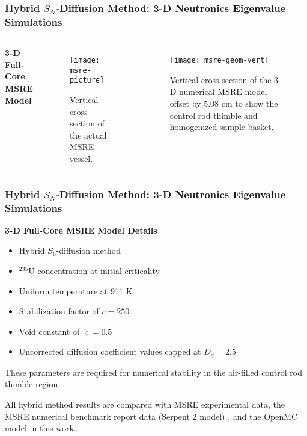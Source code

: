 \begin{frame}
  \frametitle{Hybrid $S_N$-Diffusion Method: 3-D Neutronics Eigenvalue Simulations}
  \begin{columns}
    \column{5.5cm}
  \textbf{3-D Full-Core MSRE Model}
  \begin{figure}[p]
    \centering
    \texttt{[image: msre-picture]}
    \caption{Vertical cross section of the actual \gls{MSRE} vessel.}
    \label{fig:msre-picture}
  \end{figure}
    \column{6cm}
  \begin{figure}[p]
    \centering
    \texttt{[image: msre-geom-vert]}
    \caption{Vertical cross section of the 3-D numerical \gls{MSRE} model offset by 5.08 cm to show
    the control rod thimble and homogenized sample basket.}
    \label{fig:msre-geom-vert}
  \end{figure}
\end{columns}
\end{frame}

\begin{frame}
  \frametitle{Hybrid $S_N$-Diffusion Method: 3-D Neutronics Eigenvalue Simulations}
  \textbf{3-D Full-Core MSRE Model Details}
  \begin{itemize}
    \item Hybrid $S_6$-diffusion method
    \item $^{235}$U concentration at initial criticality
    \item Uniform temperature at 911 K
    \item Stabilization factor of $c=250$
    \item Void constant of $\varsigma=0.5$
    \item Uncorrected diffusion coefficient values capped at $D_g = 2.5$
  \end{itemize}
  \vspace{.2cm}

  These parameters are required for numerical stability in the air-filled control rod
  thimble region.
  \vspace{.2cm}

  All hybrid method results are compared with MSRE experimental data, the MSRE numerical benchmark
  report data (Serpent 2 model) \cite{fratoni_molten_2020}, and the OpenMC model in this work.
\end{frame}


